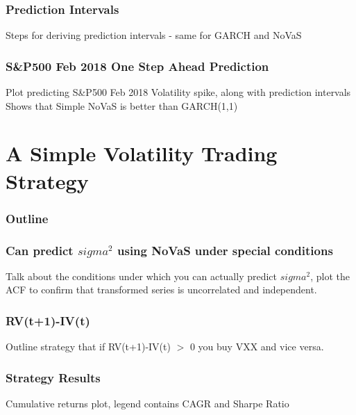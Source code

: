 \documentclass{beamer}
\begin{document}
\begin{frame}
\frametitle{Prediction Intervals}
Steps for deriving prediction intervals - same for GARCH and NoVaS
\end{frame}

\begin{frame}
\frametitle{S&P500 Feb 2018 One Step Ahead Prediction}
Plot predicting S&P500 Feb 2018 Volatility spike, along with prediction intervals
Shows that Simple NoVaS is better than GARCH(1,1)
\end{frame}

\section{A Simple Volatility Trading Strategy}

\begin{frame}
\frametitle{Outline}
\tableofcontents[currentsection]
\end{frame}

\begin{frame}
\frametitle{Can predict $sigma^2$ using NoVaS under special conditions}
Talk about the conditions under which you can actually predict $sigma^2$, plot the ACF to confirm that transformed series is uncorrelated and independent.
\end{frame}

\begin{frame}
\frametitle{RV(t+1)-IV(t)}
Outline strategy that if RV(t+1)-IV(t) $>$ 0 you buy VXX and vice versa.
\end{frame}

\begin{frame}
\frametitle{Strategy Results}
Cumulative returns plot, legend contains CAGR and Sharpe Ratio
\end{frame}
\end{document}

